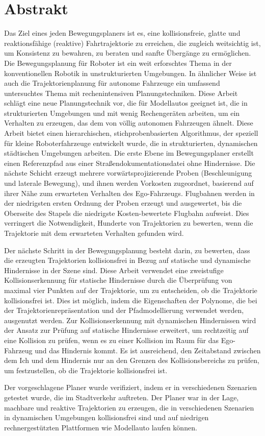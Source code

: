 \chapter*{Abstrakt}
Das Ziel eines jeden Bewegungsplaners ist es, eine kollisionsfreie, glatte und reaktionsfähige (reaktive) Fahrtrajektorie zu erreichen, die zugleich weitsichtig ist, um Konsistenz zu bewahren, zu beraten und sanfte Übergänge zu ermöglichen. Die Bewegungsplanung für Roboter ist ein weit erforschtes Thema in der konventionellen Robotik in unstrukturierten Umgebungen. In ähnlicher Weise ist auch die Trajektorienplanung für autonome Fahrzeuge ein umfassend untersuchtes Thema mit rechenintensiven Planungstechniken. Diese Arbeit schlägt eine neue Planungstechnik vor, die für Modellautos geeignet ist, die in strukturierten Umgebungen und mit wenig Rechengeräten arbeiten, um ein Verhalten zu erzeugen, das dem von völlig autonomen Fahrzeugen ähnelt. Diese Arbeit bietet einen hierarchischen, stichprobenbasierten Algorithmus, der speziell für kleine Roboterfahrzeuge entwickelt wurde, die in strukturierten, dynamischen städtischen Umgebungen arbeiten. Die erste Ebene im Bewegungsplaner erstellt einen Referenzpfad aus einer Straßendokumentationsdatei ohne Hindernisse. Die nächste Schicht erzeugt mehrere vorwärtsprojizierende Proben (Beschleunigung und laterale Bewegung), und ihnen werden Vorkosten zugeordnet, basierend auf ihrer Nähe zum erwarteten Verhalten des Ego-Fahrzeugs. Flugbahnen werden in der niedrigsten ersten Ordnung der Proben erzeugt und ausgewertet, bis die Oberseite des Stapels die niedrigste Kosten-bewertete Flugbahn aufweist. Dies verringert die Notwendigkeit, Hunderte von Trajektorien zu bewerten, wenn die Trajektorie mit dem erwarteten Verhalten gefunden wird.

Der nächste Schritt in der Bewegungsplanung besteht darin, zu bewerten, dass die erzeugten Trajektorien kollisionsfrei in Bezug auf statische und dynamische Hindernisse in der Szene sind. Diese Arbeit verwendet eine zweistufige Kollisionserkennung für statische Hindernisse durch die Überprüfung von maximal vier Punkten auf der Trajektorie, um zu entscheiden, ob die Trajektorie kollisionsfrei ist. Dies ist möglich, indem die Eigenschaften der Polynome, die bei der Trajektorienrepräsentation und der Pfadmodellierung verwendet werden, ausgenutzt werden. Zur Kollisionserkennung mit dynamischen Hindernissen wird der Ansatz zur Prüfung auf statische Hindernisse erweitert, um rechtzeitig auf eine Kollision zu prüfen, wenn es zu einer Kollision im Raum für das Ego-Fahrzeug und das Hindernis kommt. Es ist ausreichend, den Zeitabstand zwischen dem Ich und dem Hindernis nur an den Grenzen des Kollisionsbereichs zu prüfen, um festzustellen, ob die Trajektorie kollisionsfrei ist.

Der vorgeschlagene Planer wurde verifiziert, indem er in verschiedenen Szenarien getestet wurde, die im Stadtverkehr auftreten. Der Planer war in der Lage, machbare und reaktive Trajektorien zu erzeugen, die in verschiedenen Szenarien in dynamischen Umgebungen kollisionsfrei sind und auf niedrigen rechnergestützten Plattformen wie Modellauto laufen können.


